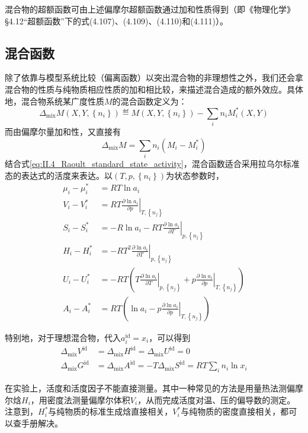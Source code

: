 \documentclass[main.tex]{subfiles}
\begin{document}
混合物的超额函数可由上述偏摩尔超额函数通过加和性质得到（即《物理化学》\S4.12“超额函数”下的式(4.107)、(4.109)、(4.110)和(4.111)）。

\subsection{混合函数}\label{sec:II.4.6 mixing_function}
除了依靠与模型系统比较（偏离函数）以突出混合物的非理想性之外，我们还会拿混合物的性质与纯物质相应性质的加和相比较，来描述混合造成的额外效应。具体地，混合物系统某广度性质$M$的混合函数定义为：
\begin{equation}\label{eq:II.4_def_mixing_function}
  \Delta_\text{mix}M\left(X,Y,\left\{n_i\right\}\right)\eqdef M\left(X,Y,\left\{n_i\right\}\right)-\sum_in_iM_i^*\left(X,Y\right)
\end{equation}
而由偏摩尔量加和性，又直接有
\[\Delta_\text{mix}M=\sum_in_i\left(M_i-M_i^*\right)\]
结合式\eqref{eq:II.4_Raoult_standard_state_activity}，混合函数适合采用拉乌尔标准态的表达式的活度来表达。以$\left(T,p,\left\{n_i\right\}\right)$为状态参数时，
\begin{align}
  \mu_i-\mu_i^* & =RT\ln a_i                                                                                                                                                       \\
  V_i-V_i^*     & =RT\left.\frac{\partial\ln a_i}{\partial p}\right|_{T,\left\{n_j\right\}}                                                                                        \\
  S_i-S_i^*     & =-R\ln a_i-RT\left.\frac{\partial\ln a_i}{\partial T}\right|_{p,\left\{n_j\right\}}                                                                              \\
  H_i-H_i^*     & =-RT^2\left.\frac{\partial\ln a_i}{\partial T}\right|_{p,\left\{n_j\right\}}                                                                                     \\
  U_i-U_i^*     & =-RT\left(T\left.\frac{\partial\ln a_i}{\partial T}\right|_{p,\left\{n_j\right\}}+p\left.\frac{\partial\ln a_i}{\partial p}\right|_{T,\left\{n_j\right\}}\right) \\
  A_i-A_i^*     & =RT\left(\ln a_i-p\left.\frac{\partial\ln a_i}{\partial p}\right|_{T,\left\{n_j\right\}}\right)
\end{align}

特别地，对于理想混合物，代入$a_i^\text{id}=x_i$，可以得到
\begin{align}
  \Delta_\text{mix}V^\text{id} & =\Delta_\text{mix}H^\text{id}=\Delta_\text{mix}U^\text{id}=0\label{eq:II.4_ideal_mixture_mixing_function_zero}                       \\
  \Delta_\text{mix}G^\text{id} & =\Delta_\text{mix}A^\text{id}=-T\Delta_\text{mix}S^\text{id}=RT\sum_in_i\ln x_i\label{eq:II.4_ideal_mixture_mixing_function_nonzero}
\end{align}

在实验上，活度和活度因子不能直接测量。其中一种常见的方法是用量热法测偏摩尔焓$H_i$\cite{Grolier2015}，用密度法测量偏摩尔体积$V_i$，从而完成活度对温、压的偏导数的测定。注意到，$H_i^*$与纯物质的标准生成焓直接相关，$V_i^*$与纯物质的密度直接相关，都可以查手册解决。
\end{document}
